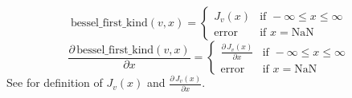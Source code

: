 \begin{description}
{\[
\mbox{bessel\_first\_kind}(v,x) = 
\begin{cases}
  J_v(x) & \mbox{if } -\infty\leq x \leq \infty \\[6pt]
  \textrm{error} & \mbox{if } x = \textrm{NaN}
\end{cases}
\]
%
\[
\frac{\partial\,\mbox{bessel\_first\_kind}(v,x)}{\partial x} = 
\begin{cases}
  \frac{\partial\, J_v(x)}{\partial x} & \mbox{if } -\infty\leq x\leq \infty \\[6pt]
  \textrm{error} & \mbox{if } x = \textrm{NaN}
\end{cases}
\]
%
See  for definition of 
$J_v(x)$ and $\frac{\partial\,J_v(x)}{\partial x}$.
}
%
\end{description}
